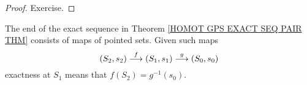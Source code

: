 \begin{proof}
Exercise.
\end{proof}

\begin{note}
The end of the exact sequence in Theorem \ref{HOMOT GPS EXACT SEQ PAIR THM} consists of maps 
of pointed sets. Given such maps 
\[
(S_{2}, s_{2}) \overset{f}{\longrightarrow} (S_{1}, s_{1}) \overset{g}{\longrightarrow} (S_{0}, s_{0})
\]
exactness at $S_{1}$ means that $f(S_{2}) = g^{-1}(s_{0})$.
\end{note}







